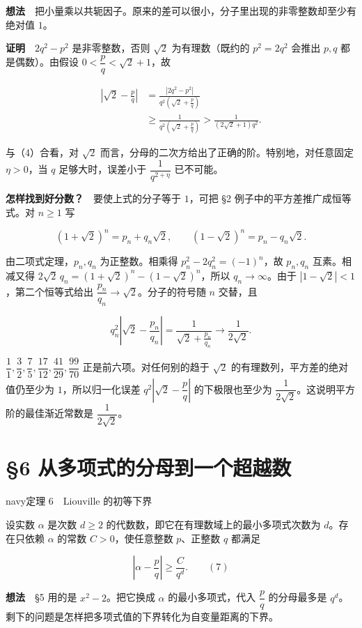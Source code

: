 \documentclass[11pt,a4paper]{article}
\newcommand{\articleheading}[1]{\section{#1}}
\begin{document}
\textbf{想法}　把小量乘以共轭因子。原来的差可以很小，分子里出现的非零整数却至少有绝对值 $1$。

\textbf{证明}　$2q^2-p^2$ 是非零整数，否则 $\sqrt2$ 为有理数（既约的 $p^2=2q^2$ 会推出 $p,q$ 都是偶数）。由假设 $0<\dfrac pq<\sqrt2+1$，故

\[
\begin{aligned}
\left|\sqrt2-\frac pq\right|
&=\frac{|2q^2-p^2|}{q^2(\sqrt2+\frac pq)}\\
&\ge\frac1{q^2(\sqrt2+\frac pq)}
{}>\frac{1}{(2\sqrt2+1)q^2}.
\end{aligned}
\]

与（4）合看，对 $\sqrt2$ 而言，分母的二次方给出了正确的阶。特别地，对任意固定 $\eta>0$，当 $q$ 足够大时，误差小于 $\dfrac1{q^{2+\eta}}$ 已不可能。

\textbf{怎样找到好分数？}　要使上式的分子等于 $1$，可把 §2 例子中的平方差推广成恒等式。对 $n\ge1$ 写

\[
(1+\sqrt2)^n=p_n+q_n\sqrt2,\qquad
(1-\sqrt2)^n=p_n-q_n\sqrt2.
\]

由二项式定理，$p_n,q_n$ 为正整数。相乘得 $p_n^2-2q_n^2=(-1)^n$，故 $p_n,q_n$ 互素。相减又得 $2\sqrt2\,q_n=(1+\sqrt2)^n-(1-\sqrt2)^n$，所以 $q_n\to\infty$。由于 $|1-\sqrt2|<1$，第二个恒等式给出 $\dfrac{p_n}{q_n}\to\sqrt2$。分子的符号随 $n$ 交替，且

\[
q_n^2\left|\sqrt2-\frac{p_n}{q_n}\right|
=\frac1{\sqrt2+\frac{p_n}{q_n}}
\longrightarrow\frac1{2\sqrt2}.
\]

$\dfrac11,\dfrac32,\dfrac75,\dfrac{17}{12},\dfrac{41}{29},\dfrac{99}{70}$ 正是前六项。对任何别的趋于 $\sqrt2$ 的有理数列，平方差的绝对值仍至少为 $1$，所以归一化误差 $q^2|\sqrt2-\dfrac pq|$ 的下极限也至少为 $\dfrac1{2\sqrt2}$。这说明平方阶的最佳渐近常数是 $\dfrac1{2\sqrt2}$。

\clearpage\articleheading{§6 从多项式的分母到一个超越数}

\begin{sboxenv}{navy}{定理 6　Liouville 的初等下界}

设实数 $\alpha$ 是次数 $d\ge2$ 的代数数，即它在有理数域上的最小多项式次数为 $d$。存在只依赖 $\alpha$ 的常数 $C>0$，使任意整数 $p$、正整数 $q$ 都满足

\[
\left|\alpha-\frac pq\right|\ge\frac C{q^d}.\qquad\mathrm{(7)}
\]
\end{sboxenv}

\textbf{想法}　§5 用的是 $x^2-2$。把它换成 $\alpha$ 的最小多项式，代入 $\dfrac pq$ 的分母最多是 $q^d$。剩下的问题是怎样把多项式值的下界转化为自变量距离的下界。
\end{document}
